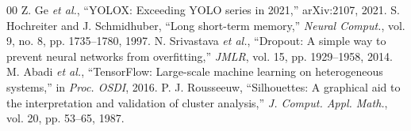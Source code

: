 \documentclass[conference]{IEEEtran}
\begin{document}
\begin{thebibliography}{00}
 Z. Ge \emph{et al.}, ``YOLOX: Exceeding YOLO series in 2021,'' arXiv:2107, 2021.
 S. Hochreiter and J. Schmidhuber, ``Long short-term memory,'' \emph{Neural Comput.}, vol. 9, no. 8, pp. 1735--1780, 1997.
 N. Srivastava \emph{et al.}, ``Dropout: A simple way to prevent neural networks from overfitting,'' \emph{JMLR}, vol. 15, pp. 1929--1958, 2014.
 M. Abadi \emph{et al.}, ``TensorFlow: Large-scale machine learning on heterogeneous systems,'' in \emph{Proc. OSDI}, 2016.
 P. J. Rousseeuw, ``Silhouettes: A graphical aid to the interpretation and validation of cluster analysis,'' \emph{J. Comput. Appl. Math.}, vol. 20, pp. 53--65, 1987.
\end{thebibliography}
\end{document}

